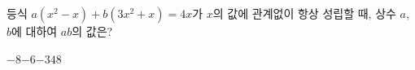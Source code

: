 등식 $a(x^2-x)+b(3x^2+x)=4x$가 $x$의 값에 관계없이 항상 성립할 때, 상수 $a$, $b$에 대하여 $ab$의 값은?
\begin{choices32}{$-8$}{$-6$}{$-3$}{$4$}{$8$}\end{choices32}
